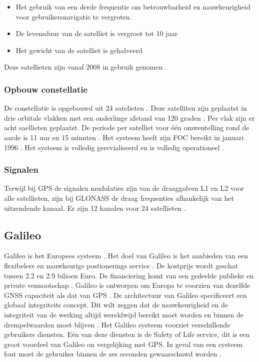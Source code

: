 \begin{itemize}
	\item Het gebruik van een derde frequentie om betrouwbarheid en nauwkeurigheid voor gebruikersnavigatie te vergroten.
	\item De levensduur van de satelliet is vergroot tot 10 jaar
	\item Het gewicht van de satelliet is gehalveerd
\end{itemize}
Deze satellieten zijn vanaf 2008 in gebruik genomen \cite{LBibPPP}.

\subsubsection{Opbouw constellatie} 
De constellatie is opgebouwd uit 24 satelieten \cite{LBibGNSS4}. Deze satelliten zijn geplaatst in drie orbitale vlakken met een onderlinge afstand van 120 graden \cite{LBibGLONASS2,LBibGNSS6, LBibGNSS8}. Per vlak zijn er acht saellieten geplaatst. De periode per satelliet voor \'e\'en omwentelling rond de aarde is 11 uur en 15 minuten \cite{LBibGNSS6}.  Het systeem heeft zijn FOC bereikt in januari 1996 \cite{LBibGLONASS}. Het systeem is volledig gerevialiseerd en is volledig operationeel \cite{LBibGNSS4}.

\subsubsection{Signalen}
Terwijl bij GPS de signalen mudolaties zijn van de draaggolven L1 en L2 voor alle satellieten, zijn bij GLONASS de draag frequenties afhankelijk van het uitzendende kanaal. Er zijn 12 kanalen voor 24 satellieten \cite{LBibGPS3}.  
 
\subsection{Galileo}
\label{LGal}
Galileo is het Europees systeem \cite{LBibGNSS3}\cite{LBibGNSS4}. Het doel van Galileo is het aanbieden van een flexibelere en nauwkeurige postionerings service \cite{LBibGNSS4}. De kostprijs wordt geschat tussen 2.2 en 2.9 bilioen Euro. De financiering komt van een gedeelde publieke en private vennootschap \cite{LBibGNSS8}. Galileo is ontworpen om Europa te voorzien van dezelfde GNSS capaciteit als dat van GPS \cite{LBibGNSS6}. De architectuur van Galileo specificeert een globaal integriteits concept. Dit wilt zeggen dat de nauwkeurigheid en de integriteit van de werking altijd wereldwijd bereikt moet worden en binnen de drempelwaarden moet blijven \cite{LBibGalileo}.  Het Galileo systeem voorziet verschillende gebruikers diensten. E\'en van deze diensten is de Safety of Life service, dit is een groot voordeel van Galileo  on vergelijking met GPS. In geval van een systeem fout moet de gebruiker binnen de zes seconden gewaarschuwd worden \cite{LBibGalileo}. 

